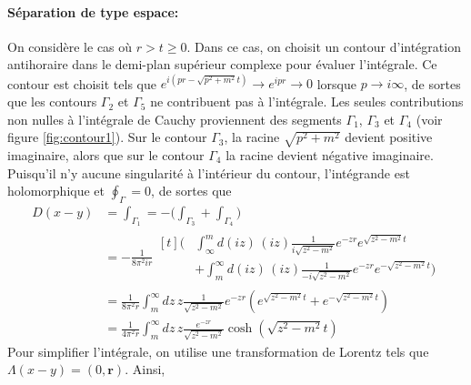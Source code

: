 \documentclass{article}
\numberwithin{equation}{section}
\begin{document}
\paragraph{Séparation de type espace:} On considère le cas où $r > t \geq 0$. 
Dans ce cas, on choisit un contour d'intégration antihoraire dans le demi-plan supérieur complexe pour évaluer l'intégrale. 
Ce contour est choisit tels que $e^{i(pr - \sqrt{p^2 + m^2}t)} \rightarrow e^{ipr}  \rightarrow 0$ lorsque $p \rightarrow  i\infty $, de sortes que 
les contours $\Gamma_2$ et $\Gamma_5$ ne contribuent pas à l'intégrale.
Les seules contributions non nulles à l'intégrale de Cauchy proviennent 
des segments $\Gamma_1$, $\Gamma_3$ et $\Gamma_4$ (voir figure \ref{fig:contour1}). Sur le contour $\Gamma_3$, la racine $\sqrt{p^2 + m^2}$ devient 
positive imaginaire, alors que sur le contour $\Gamma_4$ la racine devient négative imaginaire. Puisqu'il n'y aucune 
singularité à l'intérieur du contour, l'intégrande est holomorphique et $\oint_\Gamma = 0$, de sortes que
\begin{align*}
        D(x - y) &= \int_{\Gamma_1}= -\bigg(\int_{\Gamma_3 } +\int_{\Gamma_4}\bigg)\\
        &= - \frac{1}{8\pi^2ir}
        \begin{aligned}[t]
                \bigg(&\int_{\infty }^{m} d(iz)\, (iz)   \frac{1}{i\sqrt{z^2 - m^2}} e^{-zr} e^{\sqrt{z^2 - m^2}t}  \\
                      & + \int_{m}^{\infty}d(iz)\, (iz) \frac{1}{-i\sqrt{z^2 - m^2}}e^{-zr} e^{-\sqrt{z^2 - m^2}t} \bigg)
        \end{aligned}\\
        &= \frac{1}{8\pi^2r}
                \int_{m }^{\infty } dz\, z   \frac{1}{\sqrt{z^2 - m^2}} e^{-zr}( e^{\sqrt{z^2 - m^2}t} 
                       +e^{-\sqrt{z^2 - m^2}t})\\
        &= \frac{1}{4\pi^2r}
        \int_{m }^{\infty } dz\, z   \frac{ e^{-zr}}{\sqrt{z^2 - m^2}}\cosh(\sqrt{z^2 - m^2}t)
\end{align*}
Pour simplifier l'intégrale, on utilise une transformation de Lorentz tels que $\Lambda(x - y) = (0, \mathbf{r})$. Ainsi,
\end{document}
